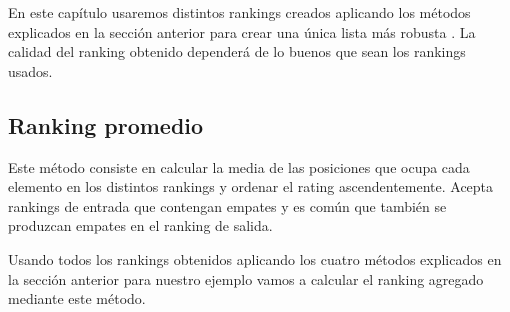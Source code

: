 En este capítulo usaremos distintos rankings creados aplicando los métodos explicados en la sección anterior para crear una única lista más robusta \cite{cap13-14}. La calidad del ranking obtenido dependerá de lo buenos que sean los rankings usados. 

\subsection{Ranking promedio}

Este método consiste en calcular la media de las posiciones que ocupa cada elemento en los distintos rankings y ordenar el rating ascendentemente. Acepta rankings de entrada que contengan empates y es común que también se produzcan empates en el ranking de salida.\\

\newpage

\begin{ejem} Usando todos los rankings obtenidos aplicando los cuatro métodos explicados en la sección anterior para nuestro ejemplo vamos a calcular el ranking agregado mediante este método.
\end{ejem}
	
